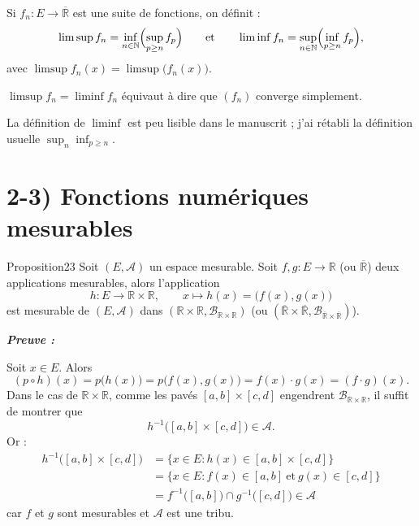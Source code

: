 \documentclass[11pt,a4paper]{article}
\newcommand{\R}{\mathbb{R}}
\newcommand{\N}{\mathbb{N}}
\newcommand{\Rb}{\overline{\mathbb{R}}}
\newcommand{\A}{\mathscr{A}}
\newcommand{\B}{\mathscr{B}}
\newenvironment{preuve}{\par\textit{\textbf{Preuve :}}\par\nopagebreak[4]}{\par}
\begin{document}
Si $f_n:E\to\Rb$ est une suite de fonctions, on définit :
\[
  \limsup f_n=\inf_{n\in\N}\Bigl(\sup_{p\ge n} f_p\Bigr)
  \qquad\text{et}\qquad
  \liminf f_n=\sup_{n\in\N}\Bigl(\inf_{p\ge n} f_p\Bigr),
\]
avec $\limsup f_n(x)=\limsup\bigl(f_n(x)\bigr)$.

$\limsup f_n=\liminf f_n$ équivaut à dire que $(f_n)$ converge simplement.

\begin{note}
La définition de $\liminf$ est peu lisible dans le manuscrit ; j'ai rétabli la définition usuelle
$\sup_n\inf_{p\ge n}$.
\end{note}

\section*{2-3) Fonctions numériques mesurables}

\begin{enonce}{Proposition}{23}
Soit $(E,\A)$ un espace mesurable. Soit $f,g:E\to\R$ (ou $\Rb$) deux applications mesurables,
alors l'application
\[
  h:E\to\R\times\R,\qquad x\longmapsto h(x)=\bigl(f(x),g(x)\bigr)
\]
est mesurable de $(E,\A)$ dans $(\R\times\R,\B_{\R\times\R})$ (ou $(\Rb\times\Rb,\B_{\Rb\times\Rb})$).
\end{enonce}

\begin{preuve}\end{preuve}

\begin{center}
\end{center}

Soit $x\in E$. Alors
\[
  (p\circ h)(x)=p\bigl(h(x)\bigr)=p\bigl(f(x),g(x)\bigr)=f(x)\cdot g(x)=(f\cdot g)(x).
\]
Dans le cas de $\R\times\R$, comme les pavés $[a,b]\times[c,d]$ engendrent $\B_{\R\times\R}$,
il suffit de montrer que
\[
  h^{-1}\bigl([a,b]\times[c,d]\bigr)\in\A .
\]
Or :
\begin{align*}
  h^{-1}\bigl([a,b]\times[c,d]\bigr)
    &=\bigl\{x\in E : h(x)\in[a,b]\times[c,d]\bigr\}\\
    &=\bigl\{x\in E : f(x)\in[a,b]\ \text{et}\ g(x)\in[c,d]\bigr\}\\
    &=f^{-1}\bigl([a,b]\bigr)\cap g^{-1}\bigl([c,d]\bigr)\in\A
\end{align*}
car $f$ et $g$ sont mesurables et $\A$ est une tribu.
\end{document}
